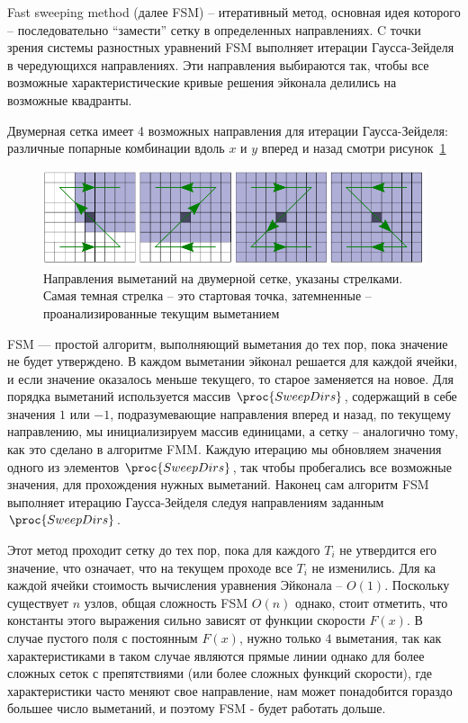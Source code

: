 \documentclass[a4paper,12pt]{article}
\begin{document}
Fast sweeping method (далее FSM) -- итеративный метод, основная идея
которого -- последовательно ``замести'' сетку в определенных
направлениях. C точки зрения системы разностных уравнений FSM
выполняет итерации Гаусса-Зейделя в чередующихся направлениях. Эти
направления выбираются так, чтобы все возможные характеристические
кривые решения эйконала делились на возможные квадранты.


Двумерная сетка имеет 4 возможных направления для итерации
Гаусса-Зейделя: различные попарные комбинации вдоль $x$ и $y$ вперед и
назад смотри рисунок~\ref{fig:fsm-sweeps}


\begin{figure}[H]
  \centering
  \includegraphics[width=\linewidth]{fsm-sweeps.png}
  \hfil \caption{Направления выметаний на двумерной сетке, указаны
    стрелками. Самая темная стрелка -- это стартовая точка,
    затемненные -- проанализированные текущим выметанием}
  \label{fig:fsm-sweeps}

\end{figure}

FSM --- простой алгоритм, выполняющий выметания до тех пор, пока
значение не будет утверждено. В каждом выметании эйконал решается для
каждой ячейки, и если значение оказалось меньше текущего, то старое
заменяется на новое. Для порядка выметаний используется массив
$\proc{SweepDirs}$, содержащий в себе значения $1$ или $-1$,
подразумевающие направления вперед и назад, по текущему направлению,
мы инициализируем массив единицами, а сетку -- аналогично тому, как
это сделано в алгоритме FMM. Каждую итерацию мы обновляем значения
одного из элементов $\proc{SweepDirs}$, так чтобы пробегались все
возможные значения, для прохождения нужных выметаний. Наконец сам
алгоритм FSM выполняет итерацию Гаусса-Зейделя следуя направлениям
заданным $\proc{SweepDirs}$.

Этот метод проходит сетку до тех пор, пока для каждого $T_i$ не утвердится
его значение, что означает, что на текущем проходе все $T_i$ не изменились.
Для ка каждой ячейки стоимость вычисления уравнения Эйконала -- $O(1)$.
Поскольку существует $n$ узлов, общая сложность FSM $O(n)$ однако, стоит
отметить, что константы этого выражения сильно зависят от функции скорости
$F(x)$. В случае пустого поля с постоянным $F(x)$, нужно только $4$
выметания, так как характеристиками в таком случае являются прямые линии
однако для более сложных сеток с препятствиями (или более сложных функций
скорости), где характеристики часто меняют свое направление, нам может
понадобится гораздо большее число выметаний, и поэтому FSM - будет работать
дольше.
\end{document}
